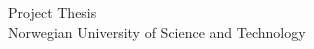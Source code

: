 \begin{titlepage}
\begin{center}

{\Huge Project Thesis} \\[1.0cm]
{\Large Norwegian University of Science and Technology}\\[4.0cm]


\end{center}
\end{titlepage}